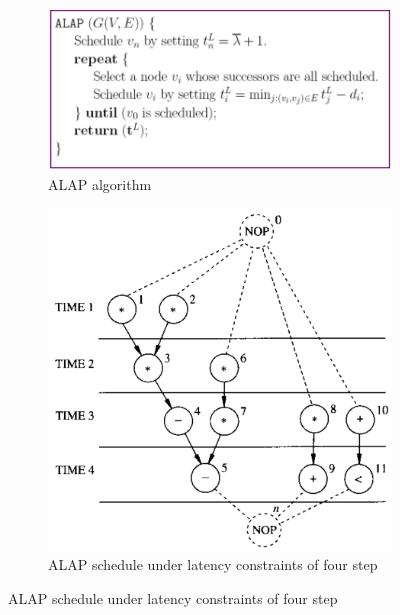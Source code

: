 \begin{figure}[H]
    \centering
    \begin{subfigure}[b]{0.5\textwidth}
        \includegraphics[width=\textwidth]{./Cap4/Images/Image06.png}
        \caption{ALAP algorithm}
   		\label{fig:ALAPAlg}
    \end{subfigure}
    \quad\quad\quad
    \begin{subfigure}[b]{0.4\textwidth}
        \includegraphics[width=\textwidth]{./Cap4/Images/Image03.png}
        \caption{ALAP  schedule under  latency constraints  of  four  step}
   		\label{fig:ALAPSch}
    \end{subfigure}
\end{figure}

